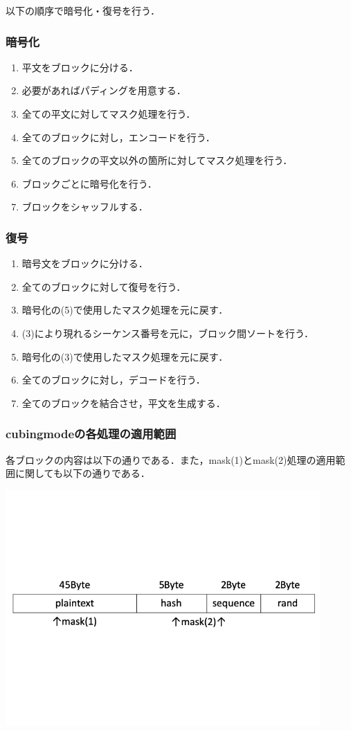 \documentclass{jsarticle}
\begin{document}
以下の順序で暗号化・復号を行う．
\subsubsection{暗号化}
\begin{enumerate}
\item 平文をブロックに分ける．
\item 必要があればパディングを用意する．
\item 全ての平文に対してマスク処理を行う．
\item 全てのブロックに対し，エンコードを行う．
\item 全てのブロックの平文以外の箇所に対してマスク処理を行う．
\item ブロックごとに暗号化を行う．
\item ブロックをシャッフルする．
\end{enumerate}

\subsubsection{復号}
\begin{enumerate}
\item 暗号文をブロックに分ける．
\item 全てのブロックに対して復号を行う．
\item 暗号化の(5)で使用したマスク処理を元に戻す．
\item (3)により現れるシーケンス番号を元に，ブロック間ソートを行う．
\item 暗号化の(3)で使用したマスク処理を元に戻す．
\item 全てのブロックに対し，デコードを行う．
\item 全てのブロックを結合させ，平文を生成する．
\end{enumerate}

\subsubsection{cubingmodeの各処理の適用範囲}
各ブロックの内容は以下の通りである．また，mask(1)とmask(2)処理の適用範囲に関しても以下の通りである．
\begin{center}
  \includegraphics[width=12cm]{./tex_pic/block.png}\\
\end{center}
\end{document}
